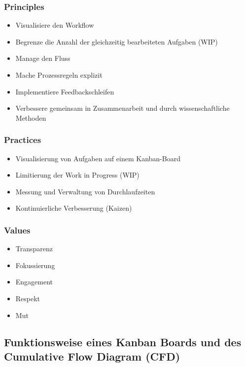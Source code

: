 \subsubsection{Principles}

\begin{itemize}
    \item Visualisiere den Workflow
    \item Begrenze die Anzahl der gleichzeitig bearbeiteten Aufgaben (WIP)
    \item Manage den Fluss
    \item Mache Prozessregeln explizit
    \item Implementiere Feedbackschleifen
    \item Verbessere gemeinsam in Zusammenarbeit und durch wissenschaftliche Methoden
\end{itemize}

\subsubsection{Practices}

\begin{itemize}
    \item Visualisierung von Aufgaben auf einem Kanban-Board
    \item Limitierung der Work in Progress (WIP)
    \item Messung und Verwaltung von Durchlaufzeiten
    \item Kontinuierliche Verbesserung (Kaizen)
\end{itemize}

\subsubsection{Values}

\begin{itemize}
    \item Transparenz
    \item Fokussierung
    \item Engagement
    \item Respekt
    \item Mut
\end{itemize}

\subsection{Funktionsweise eines Kanban Boards und des Cumulative Flow Diagram (CFD)}

